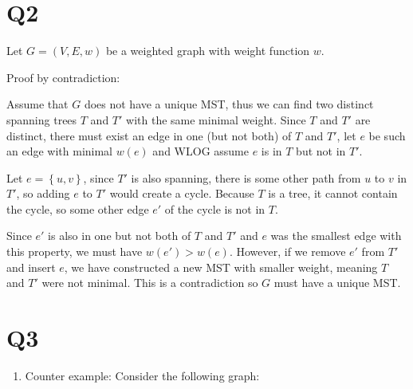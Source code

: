 \documentclass[a4paper, 11pt]{article}
\def\set#1{\left\{ #1 \right\}}
\begin{document}
\begin{multicols*}{2}
	\section*{Q2}

	Let $G=(V,E,w)$ be a weighted graph with weight function $w$.

	Proof by contradiction:

	Assume that $G$ does not have a unique MST, thus we can find two distinct spanning trees $T$ and $T'$ with the same minimal weight. Since $T$ and $T'$ are distinct, there must exist an edge in one (but not both) of $T$ and $T'$, let $e$ be such an edge with minimal $w(e)$ and WLOG assume $e$ is in $T$ but not in $T'$.

	Let $e=\set{u,v}$, since $T'$ is also spanning, there is some other path from $u$ to $v$ in $T'$, so adding $e$ to $T'$ would create a cycle. Because $T$ is a tree, it cannot contain the cycle, so some other edge $e'$ of the cycle is not in $T$.

	Since $e'$ is also in one but not both of $T$ and $T'$ and $e$ was the smallest edge with this property, we must have $w(e')>w(e)$. However, if we remove $e'$ from $T'$ and insert $e$, we have constructed a new MST with smaller weight, meaning $T$ and $T'$ were not minimal. This is a contradiction so $G$ must have a unique MST.

	\section*{Q3}
	\begin{enumerate}[label=(\alph*)]
		\item Counter example: Consider the following graph:
		      \begin{center}
\end{center}
\end{enumerate}
\end{multicols*}
\end{document}
